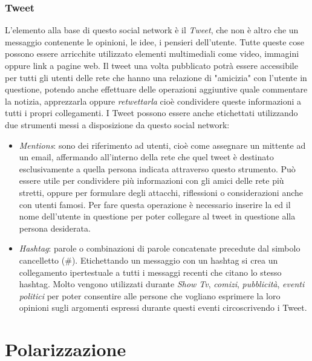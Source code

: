 \subsubsection{Tweet}
L'elemento alla base di questo social network è il \textit{Tweet}, che non è altro che un messaggio contenente le opinioni, le idee, i pensieri dell'utente. Tutte queste cose possono essere arricchite utilizzato elementi multimediali come video, immagini oppure link a pagine web. Il tweet una volta pubblicato potrà essere accessibile per tutti gli utenti delle rete che hanno una relazione di "amicizia" con l'utente in questione, potendo anche effettuare delle operazioni aggiuntive quale commentare la notizia, apprezzarla oppure \textit{retwettarla} cioè condividere queste informazioni a tutti i propri collegamenti.
I Tweet possono essere anche etichettati utilizzando due strumenti messi a disposizione da questo social network:
\begin{itemize}
\item \textit{Mentions}: sono dei riferimento ad utenti, cioè come assegnare un mittente ad un email, affermando all'interno della rete che quel tweet è destinato esclusivamente a quella persona indicata attraverso questo strumento. Può essere utile per condividere più informazioni con gli amici delle rete più stretti, oppure per formulare degli attacchi, riflessioni o considerazioni anche con utenti famosi. Per fare questa operazione è necessario inserire la \@ ed il nome dell'utente in questione per poter collegare al tweet in questione alla persona desiderata.
\item \textit{Hashtag}: parole o combinazioni di parole concatenate precedute dal simbolo cancelletto (\#).
Etichettando un messaggio con un hashtag si crea un collegamento ipertestuale a tutti i messaggi recenti che citano lo stesso hashtag. Molto  vengono utilizzati durante \textit{Show Tv}, \textit{comizi}, \textit{pubblicità}, \textit{eventi politici} per poter consentire alle persone che vogliano esprimere la loro opinioni sugli argomenti espressi durante questi eventi circoscrivendo i Tweet. 

\end{itemize}

\section{Polarizzazione}
